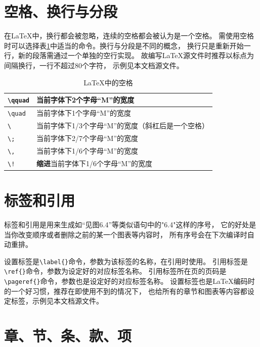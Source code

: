 \section{空格、换行与分段}
\label{sec-space-linkbreak-par}

在\LaTeX{}中，换行都会被忽略，连续的空格都会被认为是一个空格。
需使用空格时可以选择表\ref{tab-space}中适当的命令。换行与分段是不同的概念，
换行只是重新开始一行，新的段落需通过一个单独的空行实现。
故编写\LaTeX{}源文件时推荐以标点为间隔换行，一行不超过80个字符，
示例见本文档源文件。

\begin{table}
    \centering
    \caption{\LaTeX{}中的空格}
    \label{tab-space}
    \begin{tabular}{l|l}
        \hline
        \verb|\qquad| & 当前字体下2个字母“M”的宽度 \\ \hline
        \verb|\quad|  & 当前字体下1个字母“M”的宽度 \\ \hline
        \verb|\ |     & 当前字体下1/3个字母“M”的宽度（斜杠后是一个空格） \\ \hline
        \verb|\;|     & 当前字体下2/7个字母“M”的宽度 \\ \hline
        \verb|\,|     & 当前字体下1/6个字母“M”的宽度 \\ \hline
        \verb|\!|     & {\bf 缩进}当前字体下1/6个字母“M”的宽度 \\ \hline
    \end{tabular}
\end{table}

\section{标签和引用}
\label{sec-label-ref}

标签和引用是用来生成如“见图6.4”等类似语句中的"6.4"这样的序号，
它的好处是当你改变顺序或者删除之前的某一个图表等内容时，
所有序号会在下次编译时自动重排。

设置标签是\verb|\label{}|命令，参数为该标签的名称，在引用时使用。
引用标签是\verb|\ref{}|命令，参数为设定好的对应标签名称。
引用标签所在页的页码是\verb|\pageref{}|命令，参数也是设定好的对应标签名称。
设置标签也是\LaTeX{}编码时的一个好习惯，推荐在即使用不到的情况下，
也给所有的章节和图表等内容都设定标签，示例见本文档源文件。

\section{章、节、条、款、项}
\label{sec-title}

